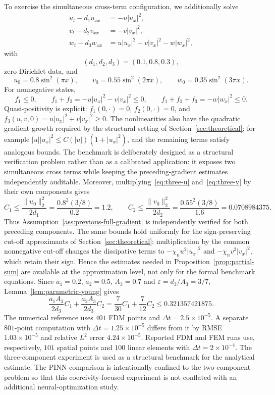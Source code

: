 To exercise the simultaneous cross-term configuration, we additionally solve
\begin{align}
 u_t-d_1u_{xx}&=-u|u_x|^2,\label{eq:three-u}\\
 v_t-d_2v_{xx}&=-v|v_x|^2,\label{eq:three-v}\\
 w_t-d_3w_{xx}&=u|u_x|^2+v|v_x|^2-w|w_x|^2,\label{eq:three-w}
\end{align}
with
\[
 (d_1,d_2,d_3)=(0.1,0.8,0.3),
\]
zero Dirichlet data, and
\[
 u_0=0.8\sin^2(\pi x),\qquad
 v_0=0.55\sin^2(2\pi x),\qquad
 w_0=0.35\sin^2(3\pi x).
\]
For nonnegative states,
\[
 f_1\le0,\qquad f_1+f_2=-u|u_x|^2-v|v_x|^2\le0,
 \qquad f_1+f_2+f_3=-w|w_x|^2\le0.
\]
Quasi-positivity is explicit: $f_1(0,\cdot)=0$, $f_2(0,\cdot)=0$, and $f_3(u,v,0)=u|u_x|^2+v|v_x|^2\ge0$. The nonlinearities also have the quadratic gradient growth required by the structural setting of Section~\ref{sec:theoretical}; for example $|u||u_x|^2\le C(|u|)(1+|u_x|^2)$, and the remaining terms satisfy analogous bounds. The benchmark is deliberately designed as a structural verification problem rather than as a calibrated application: it exposes two simultaneous cross terms while keeping the preceding-gradient estimates independently auditable. Moreover, multiplying~\eqref{eq:three-u} and~\eqref{eq:three-v} by their own components gives
\[
 C_1\le \frac{\|u_0\|_2^2}{2d_1}
 =\frac{0.8^2(3/8)}{0.2}=1.2,
\qquad
 C_2\le \frac{\|v_0\|_2^2}{2d_2}
 =\frac{0.55^2(3/8)}{1.6}=0.0708984375.
\]
Thus Assumption~\ref{ass:previous-full-gradient} is independently verified for both preceding components. The same bounds hold uniformly for the sign-preserving cut-off approximants of Section~\ref{sec:theoretical}: multiplication by the common nonnegative cut-off changes the dissipative terms to $-\chi_n u^2|u_x|^2$ and $-\chi_n v^2|v_x|^2$, which retain their sign. Hence the estimates needed in Proposition~\ref{prop:partial-sum} are available at the approximation level, not only for the formal benchmark equations. Since $a_1=0.2$, $a_2=0.5$, $A_3=0.7$ and $\varepsilon=d_3/A_3=3/7$, Lemma~\ref{lem:parametric-young} gives
\[
 \frac{a_1A_3}{2d_3}C_1+\frac{a_2A_3}{2d_3}C_2
 =\frac7{30}C_1+\frac7{12}C_2
 \le 0.321357421875.
\]
The numerical reference uses $401$ FDM points and $\Delta t=2.5\times10^{-5}$. A separate $801$-point computation with $\Delta t=1.25\times10^{-5}$ differs from it by RMSE $1.03\times10^{-5}$ and relative $L^2$ error $4.24\times10^{-5}$. Reported FDM and FEM runs use, respectively, $101$ spatial points and $100$ linear elements with $\Delta t=2\times10^{-4}$. The three-component experiment is used as a structural benchmark for the analytical estimate. The PINN comparison is intentionally confined to the two-component problem so that this coercivity-focused experiment is not conflated with an additional neural-optimization study.

